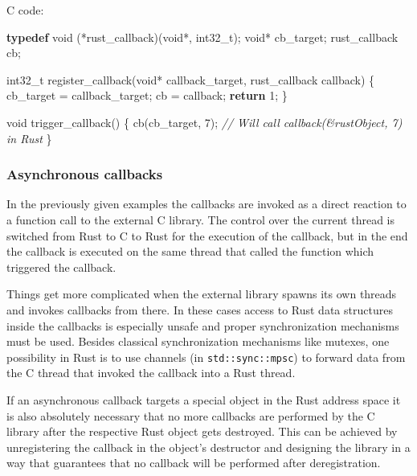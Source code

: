 \documentclass[a4paper,]{book}
\newenvironment{Shaded}{\begin{snugshade}}{\end{snugshade}}
\newcommand{\KeywordTok}[1]{\textcolor[rgb]{0.13,0.29,0.53}{\textbf{{#1}}}}
\newcommand{\DataTypeTok}[1]{\textcolor[rgb]{0.13,0.29,0.53}{{#1}}}
\newcommand{\DecValTok}[1]{\textcolor[rgb]{0.00,0.00,0.81}{{#1}}}
\newcommand{\CommentTok}[1]{\textcolor[rgb]{0.56,0.35,0.01}{\textit{{#1}}}}
\newcommand{\NormalTok}[1]{{#1}}
\begin{document}
C code:

\begin{Shaded}
\begin{Highlighting}[]
\KeywordTok{typedef} \DataTypeTok{void} \NormalTok{(*rust_callback)(}\DataTypeTok{void}\NormalTok{*, }\DataTypeTok{int32_t}\NormalTok{);}
\DataTypeTok{void}\NormalTok{* cb_target;}
\NormalTok{rust_callback cb;}

\DataTypeTok{int32_t} \NormalTok{register_callback(}\DataTypeTok{void}\NormalTok{* callback_target, rust_callback callback) \{}
    \NormalTok{cb_target = callback_target;}
    \NormalTok{cb = callback;}
    \KeywordTok{return} \DecValTok{1}\NormalTok{;}
\NormalTok{\}}

\DataTypeTok{void} \NormalTok{trigger_callback() \{}
  \NormalTok{cb(cb_target, }\DecValTok{7}\NormalTok{); }\CommentTok{// Will call callback(&rustObject, 7) in Rust}
\NormalTok{\}}
\end{Highlighting}
\end{Shaded}

\subsubsection{Asynchronous callbacks}\label{asynchronous-callbacks}

In the previously given examples the callbacks are invoked as a direct
reaction to a function call to the external C library. The control over
the current thread is switched from Rust to C to Rust for the execution
of the callback, but in the end the callback is executed on the same
thread that called the function which triggered the callback.

Things get more complicated when the external library spawns its own
threads and invokes callbacks from there. In these cases access to Rust
data structures inside the callbacks is especially unsafe and proper
synchronization mechanisms must be used. Besides classical
synchronization mechanisms like mutexes, one possibility in Rust is to
use channels (in \texttt{std::sync::mpsc}) to forward data from the C
thread that invoked the callback into a Rust thread.

If an asynchronous callback targets a special object in the Rust address
space it is also absolutely necessary that no more callbacks are
performed by the C library after the respective Rust object gets
destroyed. This can be achieved by unregistering the callback in the
object's destructor and designing the library in a way that guarantees
that no callback will be performed after deregistration.
\end{document}
